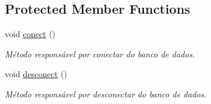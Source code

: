 \subsection*{Protected Member Functions}
\begin{DoxyCompactItemize}
\item 
\hypertarget{class_a_command_a7ef6229ca895b6c264d4e466c08fe331}{void \hyperlink{class_a_command_a7ef6229ca895b6c264d4e466c08fe331}{conect} ()}\label{class_a_command_a7ef6229ca895b6c264d4e466c08fe331}

\begin{DoxyCompactList}\small\item\em Método responsável por conectar do banco de dados. \end{DoxyCompactList}\item 
\hypertarget{class_a_command_a07aaf5d1dd0efacfd9512154db5a845e}{void \hyperlink{class_a_command_a07aaf5d1dd0efacfd9512154db5a845e}{desconect} ()}\label{class_a_command_a07aaf5d1dd0efacfd9512154db5a845e}

\begin{DoxyCompactList}\small\item\em Método responsável por desconectar do banco de dados. \end{DoxyCompactList}\end{DoxyCompactItemize}
